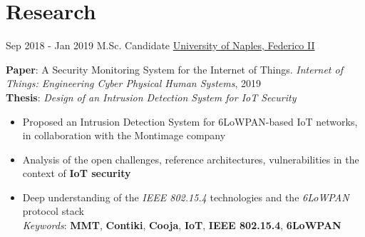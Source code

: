 \documentclass[letterpaper]{twentysecondcv} %
\begin{document}
\section{Research}
\begin{twenty}
	\twentyitem
    	{Sep 2018 -}
		{Jan 2019}
        {M.Sc. Candidate}
        {\href{http://www.scuolapsb.unina.it/}{University of Naples, Federico II}}
        {}
        {
       	\textbf{Paper}: A Security Monitoring System for the Internet of Things.  \textit{Internet of Things: Engineering Cyber Physical Human Systems}, 2019 \\
       	\textbf{Thesis}: \textit{Design of an Intrusion Detection System for IoT Security}
        {
            \begin{itemize}
                \item Proposed an Intrusion Detection System for 6LoWPAN-based IoT networks, in collaboration with the Montimage company
                \item Analysis of the open challenges, reference architectures, vulnerabilities in the context of \textbf{IoT security}
                \item Deep understanding of the \textit{IEEE 802.15.4} technologies and the \textit{6LoWPAN} protocol stack \\
                \textit{Keywords}: \textbf{MMT}, \textbf{Contiki}, \textbf{Cooja}, \textbf{IoT}, \textbf{IEEE 802.15.4}, \textbf{6LoWPAN}
		    \end{itemize}}
        }
\end{twenty}
%
%
\end{document}
